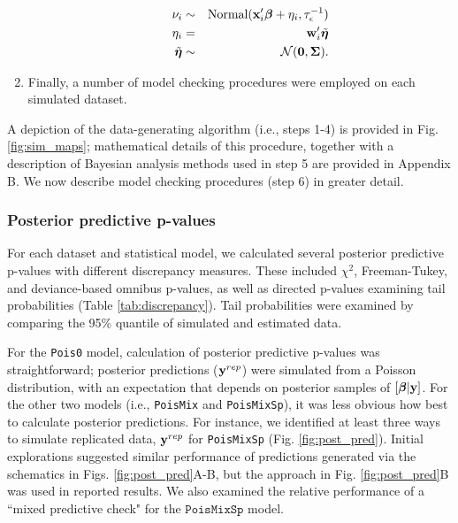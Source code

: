 \documentclass[12pt,english]{article}
\begin{document}
\begin{spacing}{1.9}
\begin{enumerate}
\begin{itemize}
\begin{eqnarray*}
      \nu_i & \sim & \textrm{Normal}({\bf x}_i^\prime \boldsymbol{\beta} + \eta_i, \tau_\epsilon^{-1}) \\
      \eta_i & = & {\bf w}_i^\prime \tilde{\boldsymbol{\eta}} \\
      \tilde{\boldsymbol{\eta}} & \sim & \mathcal{N}(\textbf{0},\boldsymbol{\Sigma}).
    \end{eqnarray*}
  \end{itemize}
\item Finally, a number of model checking procedures were employed on
  each simulated dataset.
\end{enumerate}
A depiction of the data-generating algorithm (i.e., steps 1-4) is
provided in Fig. \ref{fig:sim_maps}; mathematical details of this
procedure, together with a description of Bayesian analysis methods
used in step 5 are provided in Appendix B.  We now describe model
checking procedures (step 6) in greater detail.

\subsubsection{Posterior predictive p-values}

For each dataset and statistical model, we calculated several
posterior predictive p-values with different discrepancy measures.
These included $\chi^2$, Freeman-Tukey, and deviance-based omnibus
p-values, as well as directed p-values examining tail probabilities
(Table \ref{tab:discrepancy}). Tail probabilities were examined by
comparing the 95\% quantile of simulated and estimated data.

For the \texttt{Pois0} model, calculation of posterior predictive
p-values was straightforward; posterior predictions (${\bf y}^{rep}$)
were simulated from a Poisson distribution, with an expectation that
depends on posterior samples of $[\boldsymbol{\beta}|{\bf y}]$.  For the other two
models (i.e., \texttt{PoisMix} and \texttt{PoisMixSp}), it was less
obvious how best to calculate posterior predictions.  For instance, we
identified at least three ways to simulate replicated data,
${\bf y}^{rep}$ for \texttt{PoisMixSp} (Fig. \ref{fig:post_pred}).
Initial explorations suggested similar performance of predictions
generated via the schematics in Figs. \ref{fig:post_pred}A-B, but the
approach in Fig. \ref{fig:post_pred}B was used in reported results.
We also examined the relative performance of a ``mixed predictive
check" \citep[][Fig. \ref{fig:post_pred}C]{MarshallSpiegelhalter2007}
for the $\texttt{PoisMixSp}$ model.


\end{spacing}
\end{document}
